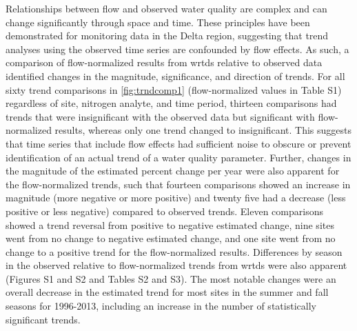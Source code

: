\documentclass[journal = esthag, manuscript = article]{achemso}\usepackage[]{graphicx}\usepackage[]{color}
\begin{document}
Relationships between flow and observed water quality are complex and can change significantly through space and time\cite{Hirsch10,Zhang16}. These principles have been demonstrated for monitoring data in the Delta region\cite{Jassby08,Novick15,Jabusch16}, suggesting that trend analyses using the observed time series are confounded by flow effects. As such, a comparison of flow-normalized results from \ac{wrtds} relative to observed data identified changes in the magnitude, significance, and direction of trends. For all sixty trend comparisons in \cref{fig:trndcomp1} (flow-normalized values in Table S1) regardless of site, nitrogen analyte, and time period, thirteen comparisons had trends that were insignificant with the observed data but significant with flow-normalized results, whereas only one trend changed to insignificant. This suggests that time series that include flow effects had sufficient noise to obscure or prevent identification of an actual trend of a water quality parameter. Further, changes in the magnitude of the estimated percent change per year were also apparent for the flow-normalized trends, such that fourteen comparisons showed an increase in magnitude (more negative or more positive) and twenty five had a decrease (less positive or less negative) compared to observed trends.  Eleven comparisons showed a trend reversal from positive to negative estimated change, nine sites went from no change to negative estimated change, and one site went from no change to a positive trend for the flow-normalized results. Differences by season in the observed relative to flow-normalized trends from \ac{wrtds} were also apparent (Figures S1 and S2 and Tables S2 and S3). The most notable changes were an overall decrease in the estimated trend for most sites in the summer and fall seasons for 1996-2013, including an increase in the number of statistically significant trends.
\end{document}
